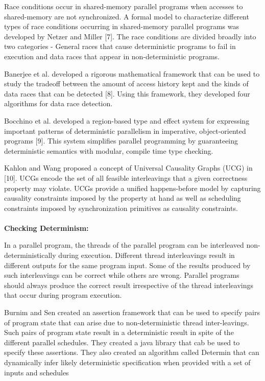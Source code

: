 Race conditions occur in shared-memory parallel programs when accesses to shared-memory are not synchronized. A formal model to characterize different types of race conditions occurring in shared-memory parallel programs was developed by Netzer and Miller [7]. The race conditions are divided broadly into two categories - General races that cause deterministic programs to fail in execution and data races that appear in non-deterministic programs.

Banerjee et al. developed a rigorous mathematical framework that can be used to study the tradeoff between the amount of access history kept and the kinds of data races that can be detected [8]. Using this framework, they developed four algorithms for data race detection. 

Bocchino et al. developed a region-based type and effect system for expressing important patterns of deterministic parallelism in imperative, object-oriented programs [9]. This system simplifies parallel programming by guaranteeing deterministic semantics with modular, compile time type checking.

Kahlon and Wang proposed a concept of Universal Causality Graphs (UCG) in [10]. UCGs encode the set of all feasible interleavings that a given correctness property may violate. UCGs provide a unified happens-before model by capturing causality constraints imposed by the property at hand as well as scheduling constraints imposed by synchronization primitives as causality constraints.\\
\\
\textbf{Checking Determinism: }

In a parallel program, the threads of the parallel program can be interleaved non-deterministically during execution. Different thread interleavings result in different outputs for the same program input. Some of the results produced by such interleavings can be correct while others are wrong. Parallel programs should always produce the correct result irrespective of the thread interleavings that occur during program execution.

Burnim and Sen created an assertion framework that can be used to specify pairs of program state that can arise due to non-deterministic thread inter-leavings. Such pairs of program state result in a deterministic result in spite of the different parallel schedules. They created a java library that cab be used to specify these assertions. They also created an algorithm called Determin that can dynamically infer likely deterministic specification when provided with a set of inputs and schedules

